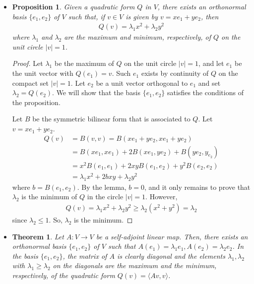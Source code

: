 \documentclass[10pt]{article}
\newtheorem{theorem}[lemma]{Theorem}
\newtheorem{proposition}[lemma]{Proposition}
\newcommand{\ra}{\rightarrow}
\begin{document}
\begin{itemize}
    \item \begin{proposition}
      Given a quadratic form $Q$ in $V$, there exists an orthonormal basis $\{ e_1, e_2 \}$ of $V$ such that, if $v \in V$ is given by $v = xe_1 + ye_2$, then
      \begin{align*}
        Q(v) = \lambda_1 x^2 + \lambda_2 y^2
      \end{align*}
      where $\lambda_1$ and $\lambda_2$ are the maximum and minimum, respectively, of $Q$ on the unit circle $|v| = 1$.
    \end{proposition}
    \begin{proof}
      Let $\lambda_1$ be the maximum of $Q$ on the unit circle $|v| = 1$, and let $e_1$ be the unit vector with $Q(e_1) = v$. Such $e_1$ exists by continuity of $Q$ on the compact set $|v| = 1$. Let $e_2$ be a unit vector orthogonal to $e_1$ and set $\lambda_2 = Q(e_2)$. We will show that the basis $\{ e_1, e_2 \}$ satisfies the conditions of the proposition.

      Let $B$ be the symmetric bilinear form that is associated to $Q$. Let $v = xe_1 + ye_2$.
      \begin{align*}
        Q(v) &= B(v,v) = B(xe_1 + ye_2, xe_1 + ye_2)\\
        &= B(xe_1, xe_1) + 2B(xe_1, ye_2) + B(ye_2, y_e_2)\\
        &= x^2 B(e_1, e_1) + 2xyB(e_1, e_2) + y^2 B(e_2, e_2)\\
        &= \lambda_1 x^2 + 2bxy + \lambda_2y^2
      \end{align*}
      where $b = B(e_1, e_2)$.  By the lemma, $b = 0$, and it only remains to prove that $\lambda_2$ is the minimum of $Q$ in the circle $|v| = 1$. However,
      \begin{align*}
        Q(v) = \lambda_1 x^2 + \lambda_2 y^2 \geq \lambda_2(x^2 + y^2)     = \lambda_2
      \end{align*}
      since $\lambda_2 \leq 1$. So, $\lambda_2$ is the minimum.
    \end{proof}

    \item \begin{theorem}
      Let $A: V \ra V$ be a self-adjoint linear map. Then, there exists an orthonormal basis $\{ e_1, e_2 \}$ of $V$ such that $A(e_1) = \lambda_1 e_1, A(e_2) = \lambda_2 e_2$. In the basis $\{ e_1, e_2 \}$, the matrix of $A$ is clearly diagonal and the elements $\lambda_1, \lambda_2$ with $\lambda_1 \geq \lambda_2$ on the diagonals are the maximum and the minimum, respectively, of the quadratic form $Q(v) = \langle Av, v \rangle$.
    \end{theorem}


\end{itemize}
\end{document}
